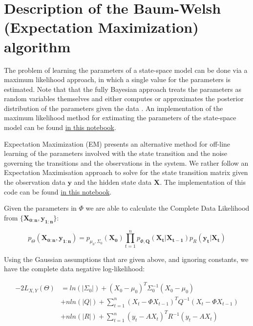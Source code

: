 \documentclass{article}
\begin{document}
\section{Description of the Baum-Welsh (Expectation Maximization) algorithm}
The problem of learning the parameters of a state-space model can be done via a maximum likelihood approach, in which a single value for the parameters is estimated. Note that that the fully Bayesian approach treats the parameters as random variables themselves and either computes or approximates the posterior distribution of the parameters given the data \cite{ghahramani2000variational}. An implementation of the maximum likelihood method for extimating the parameters of the state-space model can be found \href{https://github.com/NickHoernle/Essil/blob/master/baseline_model/switching-state-space-model.ipynb}{in this notebook}.

Expectation Maximization (EM) presents an alternative method for off-line learning of the parameters involved with the state transition and the noise governing the transitions and the observations in the system. We rather follow an Expectation Maximisation approach to solve for the state transition matrix given the observation data $\mathbf{y}$ and the hidden state data $\mathbf{X}$. The implementation of this code can be found \href{https://github.com/NickHoernle/Essil/blob/master/baseline_model/baum_welch_algorithm.ipynb}{in this notebook}.

Given the parameters in $\Phi$ we are able to calculate the Complete Data Likelihood from $\{ \mathbf{X_{0:n}}, \mathbf{y_{1:n}} \}$:

\begin{equation}\label{eq:complete_data_likelihood}
p_\Theta (\mathbf{X_{0:n}}, \mathbf{y_{1:n}}) = p_{\mu_0, \Sigma_0}(\mathbf{X_0}) \prod\limits_{t=1}^{n} p_{\Phi, \mathbf{Q}} ( \mathbf{X_t} \vert \mathbf{X_{t-1}} )  p_{R} (  \mathbf{y_t} \vert  \mathbf{X_t} )
\end{equation}

Using the Gaussian assumptions that are given above, and ignoring constants, we have the complete data negative log-likelihood:

\begin{equation}\label{eq:complete_data_log_likelihood}
  \begin{split}
-2 L_{X,Y}(\Theta) &= ln( \vert \Sigma_0 \vert ) + (X_0 - \mu_0)^T\Sigma_0^{-1}(X_0 - \mu_0) \\
&+ n ln(\vert Q \vert ) + \sum\limits_{t=1}^{n} (X_t - \Phi X_{t-1})^T Q^{-1} (X_t - \Phi X_{t-1}) \\
&+ n ln(\vert R \vert ) + \sum\limits_{t=1}^{n} (y_t - A X_{t})^T R^{-1} (y_t - A X_{t})
  \end{split}
\end{equation}
\end{document}
